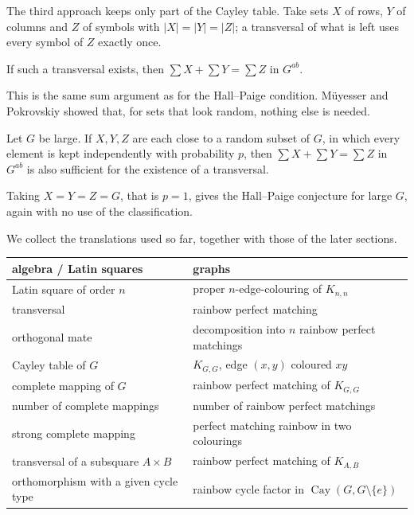 
The third approach keeps only part of the Cayley table. Take sets $X$ of rows, $Y$ of columns and $Z$ of symbols with $|X|=|Y|=|Z|$; a transversal of what is left uses every symbol of $Z$ exactly once.

\begin{fact}\label{fact:sum}
If such a transversal exists, then $\sum X+\sum Y=\sum Z$ in $G^{ab}$.
\end{fact}

This is the same sum argument as for the Hall--Paige condition. M\"uyesser and Pokrovskiy showed that, for sets that look random, nothing else is needed.

\begin{theorem}\label{thm:random-hp}
Let $G$ be large. If $X,Y,Z$ are each close to a random subset of $G$, in which every element is kept independently with probability $p$, then $\sum X+\sum Y=\sum Z$ in $G^{ab}$ is also sufficient for the existence of a transversal.
\end{theorem}

Taking $X=Y=Z=G$, that is $p=1$, gives the Hall--Paige conjecture for large $G$, again with no use of the classification.


We collect the translations used so far, together with those of the later sections.

\begin{center}
\renewcommand{\arraystretch}{1.25}
\small
\begin{tabular}{p{}p{}}
\textbf{algebra / Latin squares} & \textbf{graphs}\\\hline
Latin square of order $n$ & proper $n$-edge-colouring of $K_{n,n}$\\
transversal & rainbow perfect matching\\
orthogonal mate & decomposition into $n$ rainbow perfect matchings\\
Cayley table of $G$ & $K_{G,G}$, edge $(x,y)$ coloured $xy$\\
complete mapping of $G$ & rainbow perfect matching of $K_{G,G}$\\
number of complete mappings & number of rainbow perfect matchings\\
strong complete mapping & perfect matching rainbow in two colourings\\
transversal of a subsquare $A\times B$ & rainbow perfect matching of $K_{A,B}$\\
orthomorphism with a given cycle type & rainbow cycle factor in $\operatorname{Cay}(G,G\setminus\{e\})$
\end{tabular}
\end{center}

